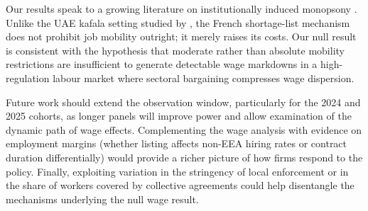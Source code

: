 \documentclass[9pt]{article}
\begin{document}
Our results speak to a growing literature on institutionally induced
monopsony \citep{Naidu2016, Amior2024}. Unlike the UAE kafala setting
studied by \citet{Naidu2016}, the French shortage-list mechanism does not
prohibit job mobility outright; it merely raises its costs. Our null
result is consistent with the hypothesis that moderate rather than
absolute mobility restrictions are insufficient to generate detectable
wage markdowns in a high-regulation labour market where sectoral
bargaining compresses wage dispersion.

Future work should extend the observation window, particularly for the
2024 and 2025 cohorts, as longer panels will improve power and allow
examination of the dynamic path of wage effects. Complementing the wage
analysis with evidence on employment margins (whether listing affects
non-EEA hiring rates or contract duration differentially) would provide
a richer picture of how firms respond to the policy. Finally, exploiting
variation in the stringency of local enforcement or in the share of
workers covered by collective agreements could help disentangle the
mechanisms underlying the null wage result.

    
    
\end{document}
